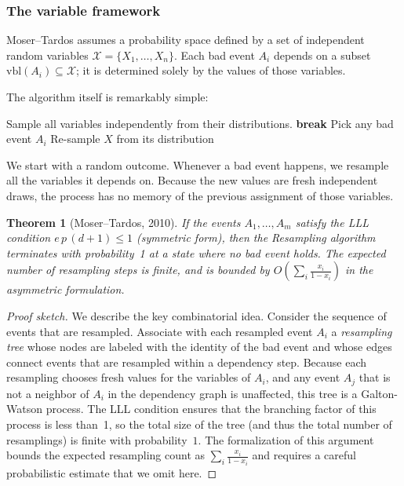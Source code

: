 \documentclass[twoside,12pt]{book}
\theoremstyle{plain}
\newtheorem{theorem}{Theorem}[chapter]
\theoremstyle{definition}
\theoremstyle{remark}
\begin{document}
\subsubsection*{The variable framework}
Moser--Tardos assumes a probability space defined by a set of
independent random variables $\mathcal{X} = \{X_1,\ldots,X_n\}$. Each
bad event $A_i$ depends on a subset $\text{vbl}(A_i) \subseteq
\mathcal{X}$; it is determined solely by the values of those variables.

The algorithm itself is remarkably simple:

\begin{algorithm}[H]
\caption{Moser--Tardos Resampling}
\label{alg:mosertardos}
\begin{algorithmic}[1]
\State Sample all variables independently from their distributions.
\Loop
      \State \textbf{break}
   \Else
      \State Pick any bad event $A_i$
         \State Re-sample $X$ from its distribution
      \EndFor
   \EndIf
\EndLoop
\end{algorithmic}
\end{algorithm}

We start with a random outcome. Whenever a bad event happens, we
resample all the variables it depends on. Because the new values are
fresh independent draws, the process has no memory of the previous
assignment of those variables.

\begin{theorem}[Moser--Tardos, 2010]
\label{thm:algorithmic-lll}
If the events $A_1,\ldots,A_m$ satisfy the LLL condition
$e\,p\,(d+1) \le 1$ (symmetric form), then the Resampling algorithm
terminates with probability~1 at a state where no bad event holds. The
expected number of resampling steps is finite, and is bounded by
$O\!\left(\sum_i \frac{x_i}{1-x_i}\right)$ in the asymmetric
formulation.
\end{theorem}

\begin{proof}[Proof sketch]
We describe the key combinatorial idea. Consider the sequence of events
that are resampled. Associate with each resampled event $A_i$ a
\emph{resampling tree} whose nodes are labeled with the identity of the
bad event and whose edges connect events that are resampled within a
dependency step. Because each resampling chooses fresh values for the
variables of $A_i$, and any event $A_j$ that is not a neighbor of $A_i$
in the dependency graph is unaffected, this tree is a Galton-Watson
process. The LLL condition ensures that the branching factor of this
process is less than~1, so the total size of the tree (and thus the
total number of resamplings) is finite with probability~$1$. The
formalization of this argument bounds the expected resampling count as
$\sum_i \frac{x_i}{1-x_i}$ and requires a careful probabilistic
estimate that we omit here.
\end{proof}
\end{document}
